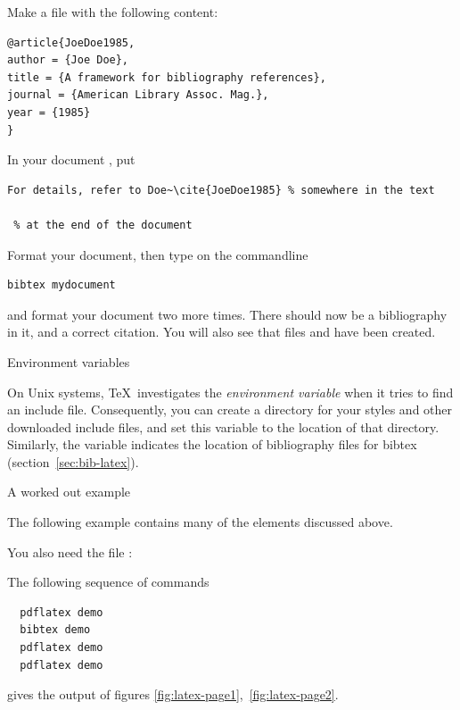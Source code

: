 Make a file  with the following content:
\begin{verbatim}
@article{JoeDoe1985,
author = {Joe Doe},
title = {A framework for bibliography references},
journal = {American Library Assoc. Mag.},
year = {1985}
}
\end{verbatim}
In your document , put
\begin{verbatim}
For details, refer to Doe~\cite{JoeDoe1985} % somewhere in the text

 % at the end of the document

\end{verbatim}
Format your document, then type on the commandline
\begin{verbatim}
bibtex mydocument
\end{verbatim}
and format your document two more times. There should now be a
bibliography in it, and a correct citation. You will also see that
files  and  have been created.

 {Environment variables}
\label{sec:texinputs}

On Unix systems, \TeX\ investigates the  \emph{environment
variable} when it tries to find an include file. Consequently, you can
create a directory for your styles and other downloaded include files,
and set this variable to the location of that directory.
Similarly, the  variable indicates the location of
bibliography files for bibtex (section~\ref{sec:bib-latex}).


 {A worked out example}

The following example  contains many of the elements discussed above.

\begin{multicols}{2}
\tiny

\end{multicols}

You also need the file :

\begin{multicols}{2}
\tiny

\end{multicols}

The following sequence of commands
\begin{verbatim}
  pdflatex demo
  bibtex demo
  pdflatex demo
  pdflatex demo
\end{verbatim}
gives the output of figures \ref{fig:latex-page1},~\ref{fig:latex-page2}.

